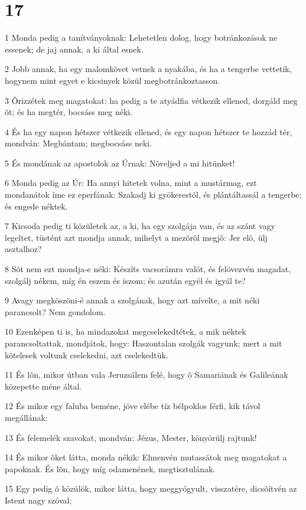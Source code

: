 \chapter{17}

\par 1 Monda pedig a tanítványoknak: Lehetetlen dolog, hogy botránkozások ne essenek; de jaj annak, a ki által esnek.
\par 2 Jobb annak, ha egy malomkövet vetnek a nyakába, és ha a tengerbe vettetik, hogynem mint egyet e kicsinyek közül megbotránkoztasson.
\par 3 Õrizzétek meg magatokat: ha pedig a te atyádfia vétkezik ellened, dorgáld meg õt; és ha megtér, bocsáss meg néki.
\par 4 És ha egy napon hétszer vétkezik ellened, és egy napon hétszer te hozzád tér, mondván: Megbántam; megbocsáss neki.
\par 5 És mondának az apostolok az Úrnak: Növeljed a mi hitünket!
\par 6 Monda pedig az Úr: Ha annyi hitetek volna, mint a mustármag, ezt mondanátok íme ez eperfának: Szakadj ki gyökerestõl, és plántáltassál a tengerbe; és engede néktek.
\par 7 Kicsoda pedig ti közületek az, a ki, ha egy szolgája van, és az szánt vagy legeltet, tüstént azt mondja annak, mihelyt a mezõrõl megjõ: Jer elõ, ülj asztalhoz?
\par 8 Sõt nem ezt mondja-e néki: Készíts vacsorámra valót, és felövezvén magadat, szolgálj nékem, míg én eszem és iszom; és azután egyél és igyál te?
\par 9 Avagy megköszöni-é annak a szolgának, hogy azt mívelte, a mit néki parancsolt? Nem gondolom.
\par 10 Ezenképen ti is, ha mindazokat megcselekedtétek, a mik néktek parancsoltattak, mondjátok, hogy: Haszontalan szolgák vagyunk; mert a mit kötelesek voltunk cselekedni, azt cselekedtük.
\par 11 És lõn, mikor útban vala Jeruzsálem felé, hogy õ Samariának és Galileának közepette méne által.
\par 12 És mikor egy faluba beméne, jöve elébe tíz bélpoklos férfi, kik távol megállának:
\par 13 És felemelék szavokat, mondván: Jézus, Mester, könyörülj rajtunk!
\par 14 És mikor õket látta, monda nékik: Elmenvén mutassátok meg magatokat a papoknak. És lõn, hogy míg odamenének, megtisztulának.
\par 15 Egy pedig õ közülök, mikor látta, hogy meggyógyult, visszatére, dicsõítvén az Istent nagy szóval;
